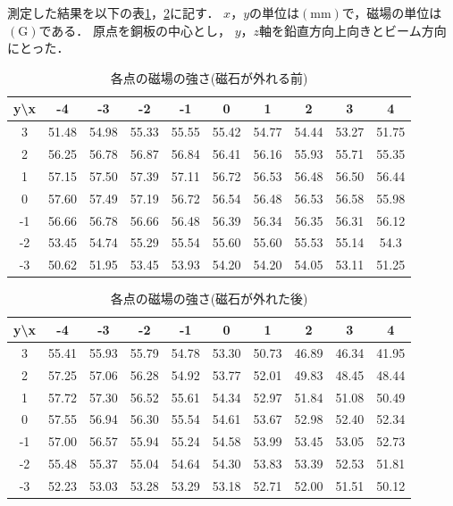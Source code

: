 測定した結果を以下の表\ref{MF1}，\ref{MF2}に記す．
$x，y$の単位は$(\mathrm{mm})$で，磁場の単位は$(\mathrm{G})$である．
原点を銅板の中心とし， $y，z$軸を鉛直方向上向きとビーム方向にとった．
\begin{table}[H]
  \begin{center}
    \caption{各点の磁場の強さ(磁石が外れる前)}\label{MF1}
    \begin{tabular}{|c||c|c|c|c|c|c|c|c|c|}\hline
       y\textbackslash x & -4 & -3 & -2 & -1 & 0 & 1 & 2 & 3 & 4 \\ \hline \hline
      3 & 51.48 & 54.98 & 55.33 & 55.55 & 55.42 & 54.77 & 54.44 & 53.27 & 51.75 \\ \hline
      2 & 56.25 & 56.78 & 56.87 & 56.84 & 56.41 & 56.16 & 55.93 & 55.71 & 55.35 \\ \hline
      1 & 57.15 & 57.50 & 57.39 & 57.11 & 56.72 & 56.53 & 56.48 & 56.50 & 56.44 \\ \hline
      0 & 57.60 & 57.49 & 57.19 & 56.72 & 56.54 & 56.48 & 56.53 & 56.58 & 55.98 \\ \hline
      -1 & 56.66 & 56.78 & 56.66 & 56.48 & 56.39 & 56.34 & 56.35 & 56.31 & 56.12 \\ \hline
      -2 & 53.45 & 54.74 & 55.29 & 55.54 & 55.60 & 55.60 & 55.53 & 55.14 & 54.3 \\ \hline
      -3 & 50.62 & 51.95 & 53.45 & 53.93 & 54.20 & 54.20 & 54.05 & 53.11 & 51.25 \\ \hline
    \end{tabular}
  \end{center}
\end{table}
\begin{table}[H]
  \begin{center}
    \caption{各点の磁場の強さ(磁石が外れた後)}\label{MF2}
    \begin{tabular}{|c||c|c|c|c|c|c|c|c|c|}\hline
       y\textbackslash x & -4 & -3 & -2 & -1 & 0 & 1 & 2 & 3 & 4 \\ \hline \hline
      3 & 55.41 & 55.93 & 55.79 & 54.78 & 53.30 & 50.73 & 46.89 & 46.34 & 41.95 \\ \hline
      2 & 57.25 & 57.06 & 56.28 & 54.92 & 53.77 & 52.01 & 49.83 & 48.45 & 48.44 \\ \hline
      1 & 57.72 & 57.30 & 56.52 & 55.61 & 54.34 & 52.97 & 51.84 & 51.08 & 50.49 \\ \hline
      0 & 57.55 & 56.94 & 56.30 & 55.54 & 54.61 & 53.67 & 52.98 & 52.40 & 52.34 \\ \hline
      -1 & 57.00 & 56.57 & 55.94 & 55.24 & 54.58 & 53.99 & 53.45 & 53.05 & 52.73 \\ \hline
      -2 & 55.48 & 55.37 & 55.04 & 54.64 & 54.30 & 53.83 & 53.39 & 52.53 & 51.81 \\ \hline
      -3 & 52.23 & 53.03 & 53.28 & 53.29 & 53.18 & 52.71 & 52.00 & 51.51 & 50.12 \\ \hline
 \end{tabular}
  \end{center}
\end{table}

